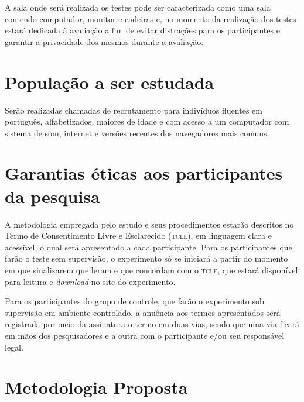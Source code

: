 \documentclass[a4paper,11pt,titlepage,singlespacing]{article}
\begin{document}
A sala onde será realizada os testes pode ser caracterizada como uma sala contendo computador, monitor e cadeiras e, no momento da realização dos testes estará dedicada à avaliação a fim de evitar distrações para os participantes e garantir a privacidade dos mesmos durante a avaliação.

\section{População a ser estudada}

\noindent Serão realizadas chamadas de recrutamento para indivíduos fluentes em português, alfabetizados, maiores de idade e com acesso a um computador com sistema de som, internet e versões recentes dos navegadores mais comuns.

\section{Garantias éticas aos participantes da pesquisa}
A metodologia empregada pelo estudo e seus procedimentos estarão descritos no Termo de Consentimento Livre e Esclarecido (\textsc{tcle}), em linguagem clara e acessível, o qual será apresentado a cada participante. Para os participantes que farão o teste sem supervisão, o experimento só se iniciará a partir do momento em que sinalizarem que leram e que concordam com o \textsc{tcle}, que estará disponível para leitura e \textit{download} no site do experimento. 

Para os participantes do grupo de controle, que farão o experimento sob supervisão em ambiente controlado, a anuência aos termos apresentados será registrada por meio da assinatura o termo em duas vias, sendo que uma via ficará em mãos dos pesquisadores e a outra com o participante e/ou seu responsável legal.



\section{Metodologia Proposta}

\end{document}
